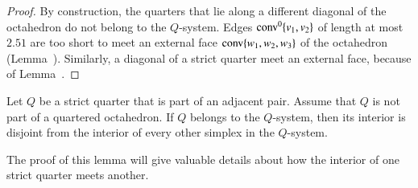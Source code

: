 \begin{proof} By construction, the quarters that lie along a
different diagonal of the octahedron do not belong to the
$Q$-system.  Edges ${\operatorname{conv}}^0\{v_1,v_2\}$  
of length at most $2.51$ are too short to meet
an external face ${\operatorname{conv}}\{w_1,w_2,w_3\}$ of the octahedron
(Lemma~). Similarly, a diagonal of a
strict quarter meet an external face,
because of Lemma~.
\end{proof}

\begin{lemma}
Let $Q$ be a strict quarter that is part of an adjacent pair.
Assume that $Q$ is not part of a quartered octahedron.  If $Q$
belongs to the $Q$-system, then its interior is disjoint from the
interior of every other simplex in the $Q$-system.
\end{lemma}

The proof of this lemma will give valuable details about how the
interior of one strict quarter meets another.

